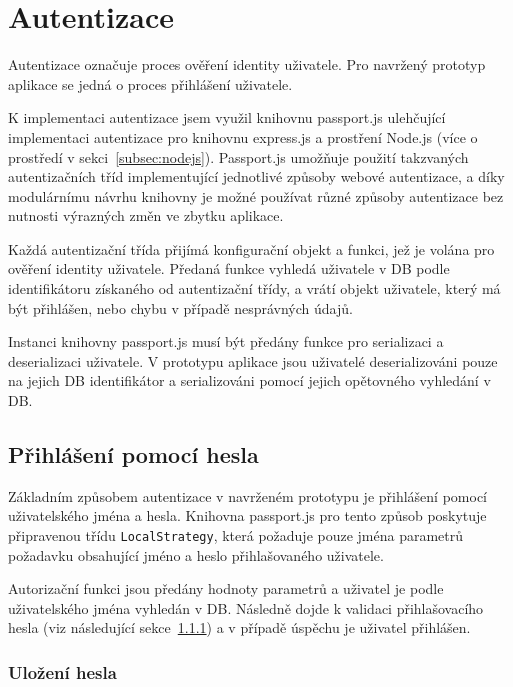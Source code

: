 
\section{Autentizace}\label{sec:autentizace}

Autentizace označuje proces ověření identity uživatele.
Pro navržený prototyp aplikace se jedná o proces přihlášení uživatele.

K implementaci autentizace jsem využil knihovnu passport.js ulehčující implementaci autentizace pro knihovnu express.js a prostření Node.js (více o prostředí v sekci~\ref{subsec:nodejs}).
Passport.js umožňuje použití takzvaných autentizačních tříd implementující jednotlivé způsoby webové autentizace, a díky modulárnímu návrhu knihovny je možné používat různé způsoby autentizace bez nutnosti výrazných změn ve zbytku aplikace.

Každá autentizační třída přijímá konfigurační objekt a funkci, jež je volána pro ověření identity uživatele.
Předaná funkce vyhledá uživatele v DB podle identifikátoru získaného od autentizační třídy, a vrátí objekt uživatele, který má být přihlášen, nebo chybu v případě nesprávných údajů.

Instanci knihovny passport.js musí být předány funkce pro serializaci a deserializaci uživatele.
V prototypu aplikace jsou uživatelé deserializováni pouze na jejich DB identifikátor a serializováni pomocí jejich opětovného vyhledání v DB.

\subsection{Přihlášení pomocí hesla}\label{subsec:přihlášeníPomocíHesla}

Základním způsobem autentizace v navrženém prototypu je přihlášení pomocí uživatelského jména a hesla.
Knihovna passport.js pro tento způsob poskytuje připravenou třídu \texttt{LocalStrategy}, která požaduje pouze jména parametrů požadavku obsahující jméno a heslo přihlašovaného uživatele.

Autorizační funkci jsou předány hodnoty parametrů a uživatel je podle uživatelského jména vyhledán v DB.
Následně dojde k validaci přihlašovacího hesla (viz následující sekce~\ref{subsubsec:uloženíHesla}) a v případě úspěchu je uživatel přihlášen.

\subsubsection{Uložení hesla}\label{subsubsec:uloženíHesla}

